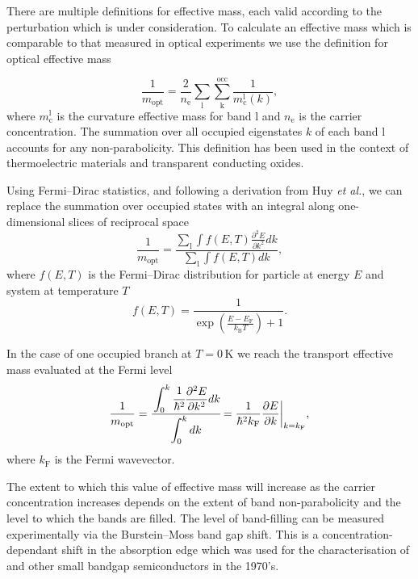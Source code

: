 There are multiple definitions for effective mass, each valid according to the perturbation which is under consideration.
To calculate an effective mass which is comparable to that measured in optical experiments we use the definition for optical effective mass

\begin{equation}
\frac{1}{m_{\text{opt}}} = \frac{2}{n_{\text{e}}}\sum_{\text{l}}\sum_{\text{k}}^{\text{occ}} \frac{1}{m_\text{c}^{\text{l}}(k)},
\end{equation}
where $m_{\text{c}}^{\text{l}}$ is the curvature effective mass for band $\text{l}$ and $n_{\text{e}}$ is the carrier concentration. 
The summation over all occupied eigenstates $k$ of each band l accounts for any non-parabolicity. 
This definition has been used in the context of thermoelectric materials\autocite{Gibbs2017} and transparent conducting oxides.\autocite{Hautier2013} 

Using Fermi--Dirac statistics, and following a derivation from Huy \textit{et al.},\autocite{Huy2011} we can replace the summation over occupied states with an integral along one-dimensional slices of reciprocal space
\begin{equation} \label{opt2}
\frac{1}{m_{\text{opt}}} = \frac{\displaystyle\sum_{\text{l}} \displaystyle\int f(E,T) \frac{\partial^2 E}{\partial k^2} dk}{\displaystyle\sum_{\text{l}} \displaystyle\int f(E,T) dk},
\end{equation}
where $f(E,T)$ is the Fermi--Dirac distribution for particle at energy $E$ and system at temperature $T$
\begin{equation} \label{fermidirac}
f(E,T) = \frac{1}{\exp\left(\frac{E-E_{\text{F}}}{k_{\text{B}}T}\right)+1}.
\end{equation}

In the case of one occupied branch at $T=0\,\mathrm{K}$ we reach the transport effective mass evaluated at the Fermi level
\begin{equation} \label{opt}   
\frac{1}{m_{\text{opt}}} = \cfrac{\displaystyle\int_0^{k} \cfrac{1}{\hbar^2}\frac{\partial^2E}{\partial k^2} dk}{\displaystyle\int_0^{k}dk} = \frac{1}{\hbar^2k_{\text{F}}} \frac{\partial E}{\partial k}\biggr\rvert_{k=k_{\text{F}}},
\end{equation}
where $k_{\text{F}}$ is the Fermi wavevector.

The extent to which this value of effective mass will increase as the carrier concentration increases depends on the extent of band non-parabolicity and the level to which the bands are filled. 
The level of band-filling can be measured experimentally via the Burstein--Moss band gap shift.\autocite{Burstein1954,Moss1954} 
This is a concentration-dependant shift in the absorption edge which was used for the characterisation of  and other small bandgap semiconductors in the 1970's. 

